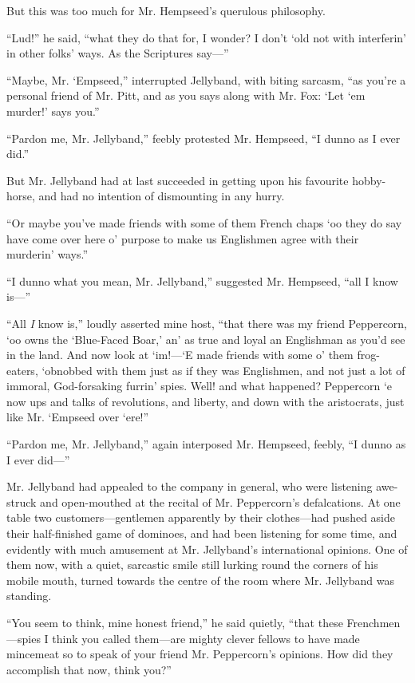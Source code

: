 \documentclass[paper=a5,BCOR=7mm,twoside,DIV=calc,12pt,usegeometry,chapterprefix,endperiod,headings=big]{scrbook}
\begin{document}
But this was too much for Mr. Hempseed's querulous philosophy.

\enquote{Lud!} he said, \enquote{what they do that for, I wonder? I don't `old not with interferin’ in other folks’ ways. As the Scriptures say---}

\enquote{Maybe, Mr. `Empseed,} interrupted Jellyband, with biting sarcasm, \enquote{as you're a personal friend of Mr. Pitt, and as you says along with Mr. Fox: \enquote{Let `em murder!} says you.}

\enquote{Pardon me, Mr. Jellyband,} feebly protested Mr. Hempseed, \enquote{I dunno as I ever did.}

But Mr. Jellyband had at last succeeded in getting upon his favourite hobby-horse, and had no intention of dismounting in any hurry.

\enquote{Or maybe you've made friends with some of them French chaps `oo they do say have come over here o’ purpose to make us Englishmen agree with their murderin’ ways.}

\enquote{I dunno what you mean, Mr. Jellyband,} suggested Mr. Hempseed, \enquote{all I know is---}

\enquote{All \textit{I} know is,} loudly asserted mine host, \enquote{that there was my friend Peppercorn, `oo owns the \enquote{Blue-Faced Boar,} an’ as true and loyal an Englishman as you'd see in the land. And now look at `im!---`E made friends with some o’ them frog-eaters, `obnobbed with them just as if they was Englishmen, and not just a lot of immoral, God-forsaking furrin’ spies. Well! and what happened? Peppercorn `e now ups and talks of revolutions, and liberty, and down with the aristocrats, just like Mr. `Empseed over `ere!}

\enquote{Pardon me, Mr. Jellyband,} again interposed Mr. Hempseed, feebly, \enquote{I dunno as I ever did---}

Mr. Jellyband had appealed to the company in general, who were listening awe-struck and open-mouthed at the recital of Mr. Peppercorn's defalcations. At one table two customers---gentlemen apparently by their clothes---had pushed aside their half-finished game of dominoes, and had been listening for some time, and evidently with much amusement at Mr. Jellyband's international opinions. One of them now, with a quiet, sarcastic smile still lurking round the corners of his mobile mouth, turned towards the centre of the room where Mr. Jellyband was standing.

\enquote{You seem to think, mine honest friend,} he said quietly, \enquote{that these Frenchmen---spies I think you called them---are mighty clever fellows to have made mincemeat so to speak of your friend Mr. Peppercorn's opinions. How did they accomplish that now, think you?}
\end{document}
